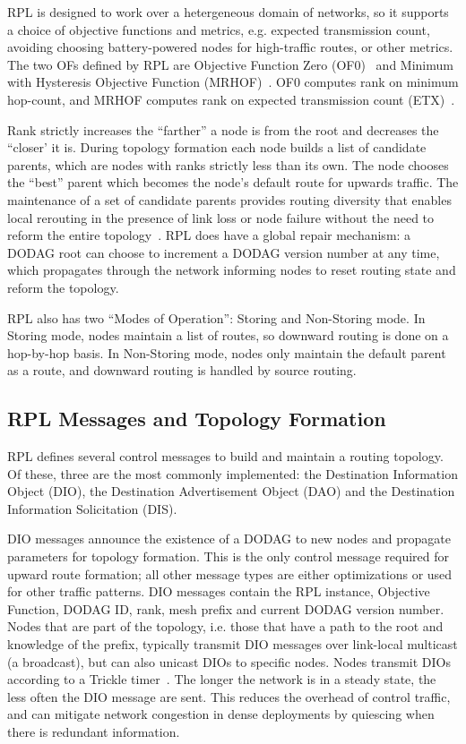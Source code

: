 RPL is designed to work over a hetergeneous domain of networks, so it supports a choice of objective functions and metrics, e.g. expected transmission count, avoiding choosing battery-powered nodes for high-traffic routes, or other metrics.
The two OFs defined by RPL are Objective Function Zero (OF0)~\cite{of0} and Minimum with Hysteresis Objective Function (MRHOF)~\cite{mrhof}.
OF0 computes rank on minimum hop-count, and MRHOF computes rank on expected transmission count (ETX)~\cite{etx}.

Rank strictly increases the ``farther'' a node is from the root and decreases the ``closer' it is.
During topology formation each node builds a list of candidate parents, which are nodes with ranks strictly less than its own.
The node chooses the ``best'' parent which becomes the node's default route for upwards traffic.
The maintenance of a set of candidate parents provides routing diversity that enables local rerouting in the presence of link loss or node failure without the need to reform the entire topology~\cite{hui2008ip}.
RPL does have a global repair mechanism: a DODAG root can choose to increment a DODAG version number at any time, which propagates through the network informing nodes to reset routing state and reform the topology.

RPL also has two ``Modes of Operation'': Storing and Non-Storing mode.
In Storing mode, nodes maintain a list of routes, so downward routing is done on a hop-by-hop basis.
In Non-Storing mode, nodes only maintain the default parent as a route, and downward routing is handled by source routing.

\subsection{RPL Messages and Topology Formation}

RPL defines several control messages to build and maintain a routing topology.
Of these, three are the most commonly implemented: the Destination Information Object (DIO), the Destination Advertisement Object (DAO) and the Destination Information Solicitation (DIS).

DIO messages announce the existence of a DODAG to new nodes and propagate parameters for topology formation.
This is the only control message required for upward route formation; all other message types are either optimizations or used for other traffic patterns.
DIO messages contain the RPL instance, Objective Function, DODAG ID, rank, mesh prefix and current DODAG version number.
Nodes that are part of the topology, i.e. those that have a path to the root and knowledge of the prefix, typically transmit DIO messages over link-local multicast (a broadcast), but can also unicast DIOs to specific nodes.
Nodes transmit DIOs according to a Trickle timer~\cite{levis2003trickle}.
The longer the network is in a steady state, the less often the DIO message are sent.
This reduces the overhead of control traffic, and can mitigate network congestion in dense deployments by quiescing when there is redundant information.

